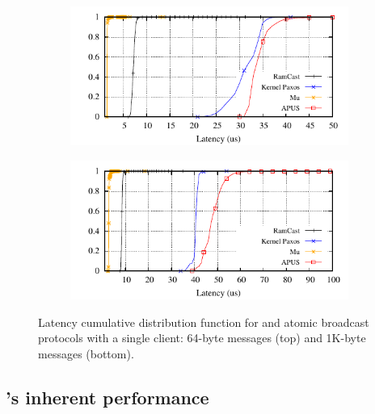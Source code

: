 \begin{figure}[htp!]
  \begin{subfigure}{\columnwidth}
    \advance\leftskip-0.0cm
    \includegraphics[width=1\columnwidth]{figures/benchmark/graphs/figure-compare-single-group-latency-cdf-64b}
  \end{subfigure}
  \begin{subfigure}{\columnwidth}
    \centering
    \includegraphics[width=1\columnwidth]{figures/benchmark/graphs/figure-compare-single-group-latency-cdf-1k}
  \end{subfigure}
  \caption{Latency cumulative distribution function for \libname and atomic broadcast protocols with a single client: 64-byte messages (top) and 1K-byte messages (bottom).}
  \label{fig:broadcast}
\end{figure}



\subsection{\libname's inherent performance}
\label{sec:evaluation:broadcast}

